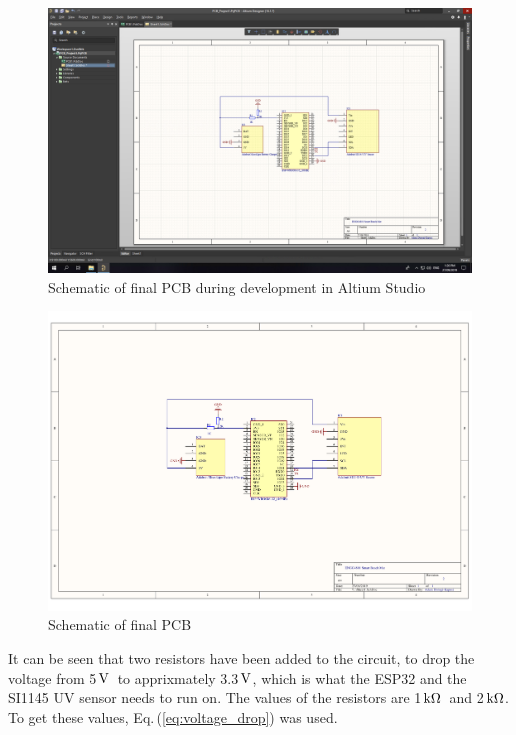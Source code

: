 \documentclass[12pt,openany,a4paper]{book}
\newcommand{\eq}[1]   {Eq.\,(\ref{#1})}		%
\newcommand{\V}		{\ensuremath{\rm\,V}}
\newcommand{\kohm}	{\ensuremath{\rm\,k\Omega}}
\begin{document}
\begin{figure}[h]
\centering\includegraphics[width=\textwidth]{altium_final_schematic_2.png}
\caption{Schematic of final PCB during development in Altium Studio}
\label{fig:schematic_screenshot}
\end{figure}

\begin{figure}[h]
\centering\includegraphics[width=\textwidth]{altium_final_pdf_2.pdf}
\caption{Schematic of final PCB}
\label{fig:schematic_pdf}
\end{figure}

It can be seen
that two resistors have been added to the circuit, to drop the voltage from 5\V\
to apprixmately 3.3\V, which is what the ESP32 and the SI1145 UV sensor needs to run on. The values of the
resistors are 1\kohm\ and 2\kohm. To get these values, \eq{eq:voltage_drop} was used.
\end{document}
